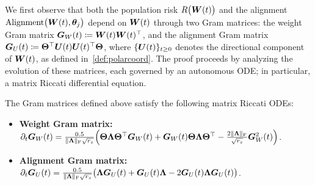  
We first observe that both the population risk $R\big(\boldsymbol{W}(t)\big)$ and the alignment $\mathrm{Alignment}\big(\boldsymbol{W}(t), \boldsymbol{\theta}_j\big)$ depend on $\boldsymbol{W}(t)$ through two Gram matrices:  the weight Gram matrix $\boldsymbol{G}_W(t) \coloneqq \boldsymbol{W}(t)\boldsymbol{W}(t)^\top$, and the  alignment Gram matrix $\boldsymbol{G}_U(t) \coloneqq \boldsymbol{\Theta}^\top \boldsymbol{U}(t)\boldsymbol{U}(t)^\top \boldsymbol{\Theta}$, where $\{\boldsymbol{U}(t)\}_{t \geq 0}$ denotes the directional component of $\boldsymbol{W}(t)$, as defined in~\eqref{def:polarcoord}. The proof proceeds by analyzing the evolution of these matrices, each governed by an autonomous ODE; in particular, a matrix Riccati differential equation.   
\begin{proposition}
\label{prop:grammatrixodes}
   The Gram matrices defined above satisfy the following matrix Riccati ODEs:
  \begin{itemize}[leftmargin=*]
      \item  \textbf{Weight Gram matrix:}  $\partial_t \boldsymbol{G}_{W}(t) = \frac{0.5}{\lVert\boldsymbol{\Lambda}\rVert_\mathrm{F} \sqrt{r_s} }   \Big(\boldsymbol{\Theta} \boldsymbol{\Lambda} \boldsymbol{\Theta}^\top  \boldsymbol{G}_{W}(t)  +  \boldsymbol{G}_{W}(t) \boldsymbol{\Theta} \boldsymbol{\Lambda} \boldsymbol{\Theta}^\top - \frac{2 \lVert\boldsymbol{\Lambda}\rVert_\mathrm{F}}{\sqrt{r_s}}  \boldsymbol{G}^2_{W}(t) \Big)$.  \vspace{-1mm}
      \item  \textbf{Alignment Gram matrix:} $\partial_t \boldsymbol{G}_{U}(t) = \frac{0.5}{\lVert\boldsymbol{\Lambda}\rVert_\mathrm{F} \sqrt{r_s} } \big(  \boldsymbol{\Lambda}    \boldsymbol{G}_{U}(t)  + \boldsymbol{G}_{U}(t)  \boldsymbol{\Lambda}  - 2  \boldsymbol{G}_{U}(t)  \boldsymbol{\Lambda} \boldsymbol{G}_{U}(t) \big)$.
  \end{itemize}
\end{proposition}


